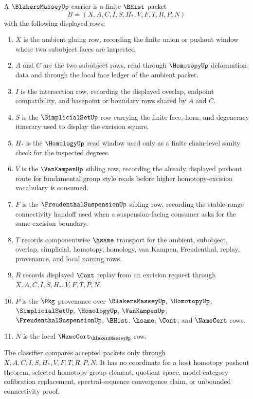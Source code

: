 \begin{definition}
\label{def:blakers-massey-carrier}
A $\BlakersMasseyUp$ carrier is a finite $\BHist$ packet
$$
B=(X,A,C,I,S,H_*,V,F,T,R,P,N)
$$
with the following displayed rows:
\begin{enumerate}
\item $X$ is the ambient gluing row, recording the finite union or pushout window whose two subobject faces are inspected.
\item $A$ and $C$ are the two subobject rows, read through $\HomotopyUp$ deformation data and through the local face ledger of the ambient packet.
\item $I$ is the intersection row, recording the displayed overlap, endpoint compatibility, and basepoint or boundary rows shared by $A$ and $C$.
\item $S$ is the $\SimplicialSetUp$ row carrying the finite face, horn, and degeneracy itinerary used to display the excision square.
\item $H_*$ is the $\HomologyUp$ read window used only as a finite chain-level sanity check for the inspected degrees.
\item $V$ is the $\VanKampenUp$ sibling row, recording the already displayed pushout route for fundamental group style reads before higher homotopy-excision vocabulary is consumed.
\item $F$ is the $\FreudenthalSuspensionUp$ sibling row, recording the stable-range connectivity handoff used when a suspension-facing consumer asks for the same excision boundary.
\item $T$ records componentwise $\hsame$ transport for the ambient, subobject, overlap, simplicial, homotopy, homology, van Kampen, Freudenthal, replay, provenance, and local naming rows.
\item $R$ records displayed $\Cont$ replay from an excision request through $X,A,C,I,S,H_*,V,F,T,P,N$.
\item $P$ is the $\Pkg$ provenance over $\BlakersMasseyUp$, $\HomotopyUp$, $\SimplicialSetUp$, $\HomologyUp$, $\VanKampenUp$, $\FreudenthalSuspensionUp$, $\BHist$, $\hsame$, $\Cont$, and $\NameCert$ rows.
\item $N$ is the local $\NameCert_{\BlakersMasseyUp}$ row.
\end{enumerate}
The classifier compares accepted packets only through $X,A,C,I,S,H_*,V,F,T,R,P,N$. It has no coordinate for a host homotopy pushout theorem, selected homotopy-group element, quotient space, model-category cofibration replacement, spectral-sequence convergence claim, or unbounded connectivity proof.
\end{definition}

